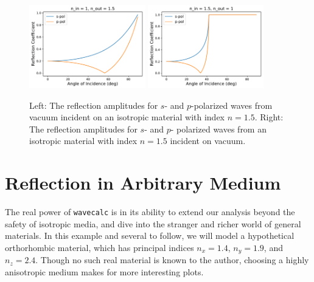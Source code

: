 \documentclass[11pt, reqno]{book}%
\newcounter{ct}
\newcommand{\tw}[1]{{\tt #1}}
\begin{document}
\begin{figure}[!htb]
  \begin{centering}
    \includegraphics[width=0.45\textwidth]{test_plots/reflection_coeffs_example.pdf}
    \includegraphics[width=0.45\textwidth]{test_plots/total_internal_reflection_example.pdf}
      \caption{Left: The reflection amplitudes for $s$- and $p$-polarized waves from vacuum incident on an isotropic material with index $n=1.5$. Right: The reflection amplitudes for $s$- and $p$- polarized waves from an isotropic material with index $n=1.5$ incident on vacuum.} \label{fig:brewsterandTIR}
      \end{centering}
\end{figure}





\section{Reflection in Arbitrary Medium}
\label{sec:arbitraryREFL}

The real power of \tw{wavecalc} is in its ability to extend our analysis beyond the safety of isotropic media, and dive into the stranger and richer world of general materials. In this example and several to follow, we will model a hypothetical orthorhombic material, which has principal indices $n_x =1.4$, $n_y = 1.9$, and $n_z =2.4$. Though no such real material is known to the author, choosing a highly anisotropic medium makes for more interesting plots.
\end{document}
